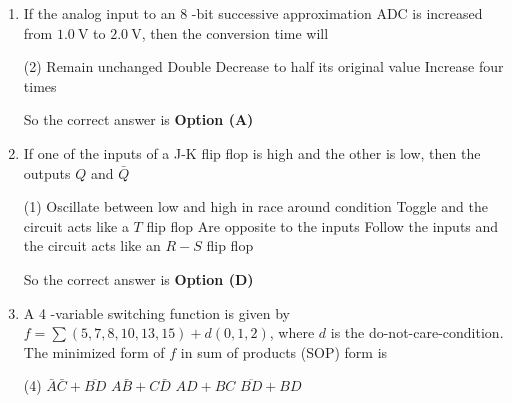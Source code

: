 \begin{enumerate}
\begin{figure}[H]
\centering
\texttt{[image: e-14]}
\end{figure}
\begin{tasks}(4)
\task[\textbf{A.}] $y=\overline{A \cdot B}$
\task[\textbf{B.}] $y=\bar{A} \cdot \bar{B}$
\task[\textbf{C.}] $y=A \cdot B$
\task[\textbf{D.}] $y=A+B$
\end{tasks}
\begin{answer}
\begin{align*}
\text{Output of each Ex-OR gate is }\bar{A} and \bar{B}.\text{ Thus }y=\bar{A}+\vec{B}=\overline{A \cdot B}
\end{align*}
So the correct answer is \textbf{Option (A)}
\end{answer}
	\item If the analog input to an 8 -bit successive approximation ADC is increased from $1.0 \mathrm{~V}$ to $2.0 \mathrm{~V}$, then the conversion time will
	{}
\begin{tasks}(2)
\task[\textbf{A.}] Remain unchanged
\task[\textbf{B.}] Double
\task[\textbf{C.}] Decrease to half its original value
\task[\textbf{D.}] Increase four times
\end{tasks}
\begin{answer}
So the correct answer is \textbf{Option (A)}
\end{answer}
	\item If one of the inputs of a J-K flip flop is high and the other is low, then the outputs $Q$ and $\bar{Q}$
{	}
\begin{tasks}(1)
\task[\textbf{A.}] Oscillate between low and high in race around condition
\task[\textbf{B.}] Toggle and the circuit acts like a $T$ flip flop
\task[\textbf{C.}] Are opposite to the inputs
\task[\textbf{D.}] Follow the inputs and the circuit acts like an $R-S$ flip flop
\end{tasks}
\begin{answer}
So the correct answer is \textbf{Option (D)}
\end{answer}
	\item A 4 -variable switching function is given by $f=\sum(5,7,8,10,13,15)+d(0,1,2)$, where $d$ is the do-not-care-condition. The minimized form of $f$ in sum of products (SOP) form is
	{}
\begin{tasks}(4)
\task[\textbf{A.}] $\bar{A} \bar{C}+\overline{B D}$
\task[\textbf{B.}] $A \bar{B}+C \bar{D}$
\task[\textbf{C.}]  $A D+B C$
\task[\textbf{D.}] $\overline{B D}+B D$
\end{tasks}

\end{enumerate}
